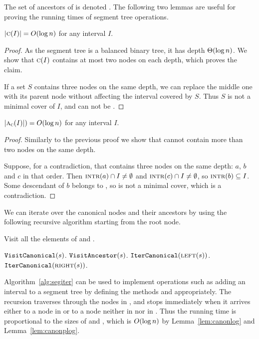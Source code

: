\documentclass[english,gradu]{tktltiki2018}
\begin{document}
The set of ancestors of  is denoted .
The following two lemmas are useful for proving the running times of segment tree operations.

\begin{lem}\label{lem:canonlog}$\left |\textsc{c}(I)\right |=O(\log n)$ for any interval $I$.\end{lem}
\begin{proof}
As the segment tree is a balanced binary tree, it has depth $\Theta(\log n)$.
We show that $\textsc{c}(I)$ contains at most two nodes on each depth, which proves the claim.

If a set $S$ contains three nodes on the same depth, we can replace the middle one with its parent node without affecting the interval covered by $S$.
Thus $S$ is not a minimal cover of $I$, and can not be .
\end{proof}

\begin{lem}\label{lem:canonplog}$\left |\textsc{a}_{\textsc{c}}(I)\right |)=O(\log n)$ for any interval $I$.\end{lem}
\begin{proof}
Similarly to the previous proof we show that  cannot contain more than two nodes on the same depth.

Suppose, for a contradiction, that  contains three nodes on the same depth: $a$, $b$ and $c$ in that order.
Then $\textsc{intr}(a)\cap I\neq\emptyset$ and $\textsc{intr}(c)\cap I\neq\emptyset$, so $\textsc{intr}(b)\subseteq I$.
Some descendant of $b$ belongs to , so  is not a minimal cover, which is a contradiction.
\end{proof}

We can iterate over the canonical nodes and their ancestors by using the following recursive algorithm starting from the root node.

\begin{alg}\label{alg:segiter}
Visit all the elements of  and .
\begin{algorithmic}
		\State $\texttt{VisitCanonical}(s)$.
		\State $\texttt{VisitAncestor}(s)$.
		\State $\texttt{IterCanonical}(\textsc{left}(s))$.
		\State $\texttt{IterCanonical}(\textsc{right}(s))$.
	\EndIf
\EndProcedure
\end{algorithmic}
\end{alg}

Algorithm~\ref{alg:segiter} can be used to implement operations such as adding an interval to a segment tree by defining the methods \visitc and \visitp appropriately.
The recursion traverses through the nodes in , and stops immediately when it arrives either to a node in  or to a node neither in  nor in .
Thus the running time is proportional to the sizes of  and , which is $O(\log n)$ by Lemma~\ref{lem:canonlog} and Lemma~\ref{lem:canonplog}.
\end{document}
